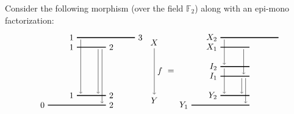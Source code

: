 \begin{example}
\label{C!ex:counterex2}
  Consider the following morphism (over the field $\mathbb{F}_2$) along with an epi-mono factorization:
  \[
    \begin{tikzpicture}[scale = 0.4, baseline={([yshift=-.5ex]current bounding box.center)}]
      \draw[line width=1pt]
        (3, 7) node[left]{$1$} -- (9, 7) node[right]{$3$}
        (3, 6) node[left]{$1$} -- (6, 6) node[right]{$2$}
        (3, 1) node[left]{$1$} -- (6, 1) node[right]{$2$}
        (0, 0) node[left]{$0$} -- (6, 0) node[right]{$2$}
      ;
      
      \draw[->] (3.4, 6.8) -- (3.4, 1.2);
      \draw[->] (5.2, 5.8) -- (5.2, 1.2);
      \draw[->] (5.6, 5.8) -- (5.6, 0.2);
      
      \node (X) at (11, 6.5) {$X$};
      \node (Y) at (11, .5) {$Y$};
      \draw[->] (X) -- node[right] {$f$} (Y);
    \end{tikzpicture}
    =
    \begin{tikzpicture}[scale = 0.4, baseline={([yshift=-.5ex]current bounding box.center)}]
      \draw[line width=1pt]
        (3, 7) node[left]{$X_2$} -- (9, 7)
        (3, 6) node[left]{$X_1$} -- (6, 6)
        
        (3, 4) node[left]{$I_2$} -- (6, 4)
        (3, 3) node[left]{$I_1$} -- (6, 3)
        
        (3, 1) node[left]{$Y_2$} -- (6, 1)
        (0, 0) node[left]{$Y_1$} -- (6, 0)
      ;
      
      \draw[->] (3.4, 6.8) -- (3.4, 4.2);
      \draw[->] (5.4, 5.8) -- (5.4, 3.2);
      
      \draw[->] (3.4, 3.8) -- (3.4, 1.2);
      \draw[->] (5.2, 2.8) -- (5.2, 1.2);
      \draw[->] (5.6, 2.8) -- (5.6, 0.2);
      

\end{tikzpicture}\]
\end{example}
